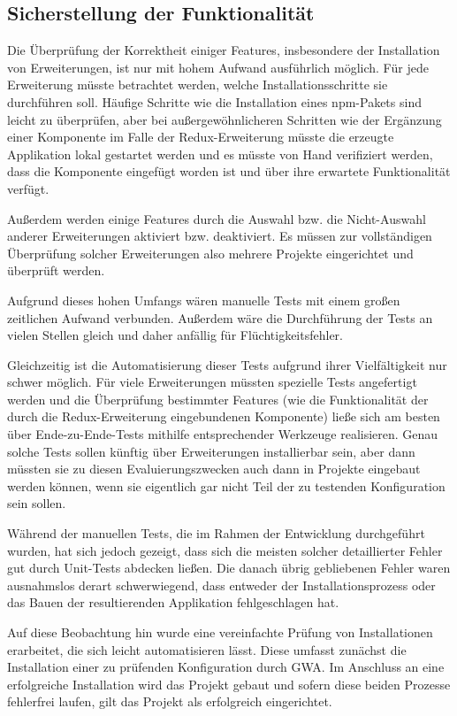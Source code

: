 \subsection{Sicherstellung der Funktionalität}
Die Überprüfung der Korrektheit einiger Features, insbesondere der Installation von Erweiterungen, ist nur mit hohem Aufwand ausführlich möglich. Für jede Erweiterung müsste betrachtet werden, welche Installationsschritte sie durchführen soll. Häufige Schritte wie die Installation eines \gls{npm}-Pakets sind leicht zu überprüfen, aber bei außergewöhnlicheren Schritten wie der Ergänzung einer Komponente im Falle der Redux-Erweiterung müsste die erzeugte Applikation lokal gestartet werden und es müsste von Hand verifiziert werden, dass die Komponente eingefügt worden ist und über ihre erwartete Funktionalität verfügt.

Außerdem werden einige Features durch die Auswahl bzw. die Nicht-Auswahl anderer Erweiterungen aktiviert bzw. deaktiviert. Es müssen zur vollständigen Überprüfung solcher Erweiterungen also mehrere Projekte eingerichtet und überprüft werden.

Aufgrund dieses hohen Umfangs wären manuelle Tests mit einem großen zeitlichen Aufwand verbunden. Außerdem wäre die Durchführung der Tests an vielen Stellen gleich und daher anfällig für Flüchtigkeitsfehler.

Gleichzeitig ist die Automatisierung dieser Tests aufgrund ihrer Vielfältigkeit nur schwer möglich. Für viele Erweiterungen müssten spezielle Tests angefertigt werden und die Überprüfung bestimmter Features (wie die Funktionalität der durch die Redux-Erweiterung eingebundenen Komponente) ließe sich am besten über Ende-zu-Ende-Tests mithilfe entsprechender Werkzeuge realisieren. Genau solche Tests sollen künftig über Erweiterungen installierbar sein, aber dann müssten sie zu diesen Evaluierungszwecken auch dann in Projekte eingebaut werden können, wenn sie eigentlich gar nicht Teil der zu testenden Konfiguration sein sollen.

Während der manuellen Tests, die im Rahmen der Entwicklung durchgeführt wurden, hat sich jedoch gezeigt, dass sich die meisten solcher detaillierter Fehler gut durch Unit-Tests abdecken ließen. Die danach übrig gebliebenen Fehler waren ausnahmslos derart schwerwiegend, dass entweder der Installationsprozess oder das Bauen der resultierenden Applikation fehlgeschlagen hat.

Auf diese Beobachtung hin wurde eine vereinfachte Prüfung von Installationen erarbeitet, die sich leicht automatisieren lässt. Diese umfasst zunächst die Installation einer zu prüfenden Konfiguration durch \gls{GWA}. Im Anschluss an eine erfolgreiche Installation wird das Projekt gebaut und sofern diese beiden Prozesse fehlerfrei laufen, gilt das Projekt als erfolgreich eingerichtet.


